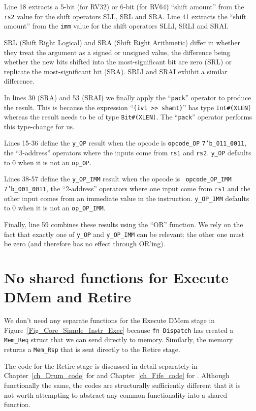 Line 18 extracts a 5-bit (for RV32) or 6-bit (for RV64) ``shift
amount'' from the {\tt rs2} value for the shift operators SLL, SRL and
SRA.  Line 41 extracts the ``shift amount'' from the {\tt imm} value
for the shift operators SLLI, SRLI and SRAI.

SRL (Shift Right Logical) and SRA (Shift Right Arithmetic) differ in
whether they treat the argument as a signed or unsigned value, the
difference being whether the new bits shifted into the
most-significant bit are zero (SRL) or replicate the most-significant
bit (SRA).  SRLI and SRAI exhibit a similar difference.

In lines 30 (SRA) and 53 (SRAI) we finally apply the ``{\tt pack}''
operator to produce the result. This is because the expression
``\verb|(iv1 >> shamt)|'' has type {\tt Int\#(XLEN)} whereas the
result needs to be of type {\tt Bit\#(XLEN)}.  The ``{\tt pack}''
operator performs this type-change for us.

Lines 15-36 define the \verb|y_OP| result when the opcode is
\verb|opcode_OP| {\ie} {\tt 7'b\_011\_0011}, {\ie} the ``3-address''
operators where the inputs come from {\tt rs1} and {\tt rs2}.
\verb|y_OP| defaults to 0 when it is not an {\tt op\_OP}.

Lines 38-57 define the \verb|y_OP_IMM| result when the opcode is {\tt
opcode\_OP\_IMM} {\ie} {\tt 7'b\_001\_0011}, {\ie} the ``2-address''
operators where one input come from {\tt rs1} and the other input
comes from an immediate value in the instruction.  \verb|y_OP_IMM|
defaults to 0 when it is not an \verb|op_OP_IMM|.

Finally, line 59 combines these results using the ``OR'' function.  We
rely on the fact that exactly one of \verb|y_OP| and \verb|y_OP_IMM|
can be relevant; the other one must be zero (and therefore has no
effect through OR'ing).




\section{No shared functions for Execute DMem and Retire}

We don't need any separate functions for the Execute DMem stage in
Figure~\ref{Fig_Core_Simple_Instr_Exec} because \verb|fn_Dispatch| has
created a \verb|Mem_Req| struct that we can send directly to memory.
Similarly, the memory returns a \verb|Mem_Rsp| that is sent directly
to the Retire stage.

The code for the Retire stage is discussed in detail separately in
Chapter~\ref{ch_Drum_code} for {\DRUM} and Chapter~\ref{ch_Fife_code} for
{\FIFE}.  Although functionally the same, the codes are structurally
sufficiently different that it is not worth attempting to abstract any
common functionality into a shared function.

